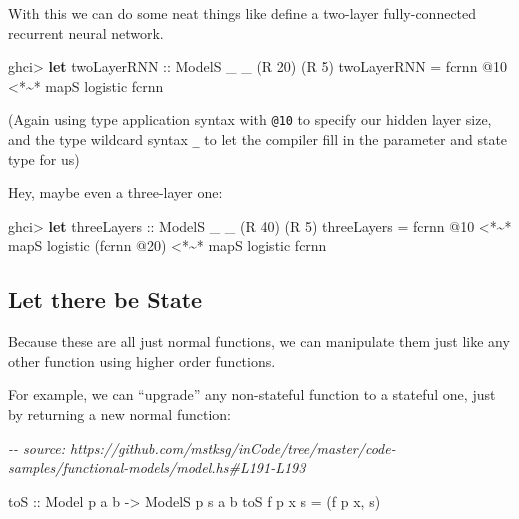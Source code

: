 \documentclass[]{article}
\newenvironment{Shaded}{}{}
\newcommand{\CommentTok}[1]{\textcolor[rgb]{0.38,0.63,0.69}{\textit{#1}}}
\newcommand{\DataTypeTok}[1]{\textcolor[rgb]{0.56,0.13,0.00}{#1}}
\newcommand{\DecValTok}[1]{\textcolor[rgb]{0.25,0.63,0.44}{#1}}
\newcommand{\KeywordTok}[1]{\textcolor[rgb]{0.00,0.44,0.13}{\textbf{#1}}}
\newcommand{\NormalTok}[1]{#1}
\newcommand{\OperatorTok}[1]{\textcolor[rgb]{0.40,0.40,0.40}{#1}}
\newcommand{\OtherTok}[1]{\textcolor[rgb]{0.00,0.44,0.13}{#1}}
\begin{document}
With this we can do some neat things like define a two-layer fully-connected
recurrent neural network.

\begin{Shaded}
\begin{Highlighting}[]
\NormalTok{ghci}\OperatorTok{\textgreater{}} \KeywordTok{let}\OtherTok{ twoLayerRNN ::} \DataTypeTok{ModelS}\NormalTok{ \_ \_ (}\DataTypeTok{R} \DecValTok{20}\NormalTok{) (}\DataTypeTok{R} \DecValTok{5}\NormalTok{)}
\NormalTok{          twoLayerRNN }\OtherTok{=}\NormalTok{ fcrnn }\OperatorTok{@}\DecValTok{10} \OperatorTok{\textless{}*\textasciitilde{}*}\NormalTok{ mapS logistic fcrnn}
\end{Highlighting}
\end{Shaded}

(Again using type application syntax with \texttt{@10} to specify our hidden
layer size, and the type wildcard syntax \texttt{\_} to let the compiler fill in
the parameter and state type for us)

Hey, maybe even a three-layer one:

\begin{Shaded}
\begin{Highlighting}[]
\NormalTok{ghci}\OperatorTok{\textgreater{}} \KeywordTok{let}\OtherTok{ threeLayers ::} \DataTypeTok{ModelS}\NormalTok{ \_ \_ (}\DataTypeTok{R} \DecValTok{40}\NormalTok{) (}\DataTypeTok{R} \DecValTok{5}\NormalTok{)}
\NormalTok{          threeLayers }\OtherTok{=}\NormalTok{ fcrnn }\OperatorTok{@}\DecValTok{10}
                   \OperatorTok{\textless{}*\textasciitilde{}*}\NormalTok{ mapS logistic (fcrnn }\OperatorTok{@}\DecValTok{20}\NormalTok{)}
                   \OperatorTok{\textless{}*\textasciitilde{}*}\NormalTok{ mapS logistic fcrnn}
\end{Highlighting}
\end{Shaded}

\subsection{Let there be State}\label{let-there-be-state}

Because these are all just normal functions, we can manipulate them just like
any other function using higher order functions.

For example, we can ``upgrade'' any non-stateful function to a stateful one,
just by returning a new normal function:

\begin{Shaded}
\begin{Highlighting}[]
\CommentTok{{-}{-} source: https://github.com/mstksg/inCode/tree/master/code{-}samples/functional{-}models/model.hs\#L191{-}L193}

\OtherTok{toS ::} \DataTypeTok{Model}\NormalTok{  p   a b}
    \OtherTok{{-}\textgreater{}} \DataTypeTok{ModelS}\NormalTok{ p s a b}
\NormalTok{toS f p x s }\OtherTok{=}\NormalTok{ (f p x, s)}
\end{Highlighting}
\end{Shaded}
\end{document}
